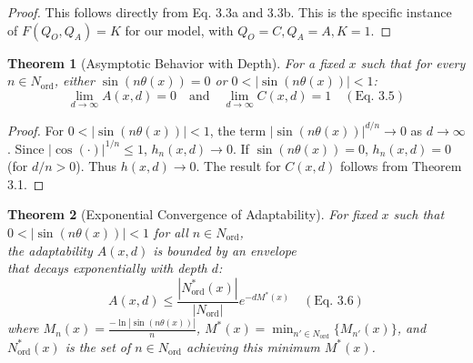 \documentclass[11pt,a4paper]{article}
\newtheorem{theorem}{Theorem}[section]
\begin{document}
\begin{proof}
This follows directly from Eq. 3.3a and 3.3b. This is the specific instance of $F(Q_O, Q_A)=K$ for our model, with $Q_O=C, Q_A=A, K=1$.
\end{proof}

\begin{theorem}[Asymptotic Behavior with Depth]
For a fixed $x$ such that for every $n \in N_{\text{ord}}$, either $\sin(n\theta(x))=0$ or $0 < |\sin(n\theta(x))|<1$:
\begin{equation}
    \lim_{d \to \infty} A(x,d) = 0 \quad \text{and} \quad \lim_{d \to \infty} C(x,d) = 1 \quad (\text{Eq. 3.5})
\end{equation}
\end{theorem}

\begin{proof}
For $0 < |\sin(n\theta(x))|<1$, the term $|\sin(n\theta(x))|^{d/n} \to 0$ as $d \to \infty$. Since $|\cos(\cdot)|^{1/n} \le 1$, $h_n(x,d) \to 0$. If $\sin(n\theta(x))=0$, $h_n(x,d)=0$ (for $d/n >0$). Thus $h(x,d) \to 0$. The result for $C(x,d)$ follows from Theorem 3.1.
\end{proof}

\begin{theorem}[Exponential Convergence of Adaptability]
For fixed $x$ such that $0 < |\sin(n\theta(x))|<1$ for all $n \in N_{\text{ord}}$, \\
the adaptability $A(x,d)$ is bounded by an envelope \\
that decays exponentially with depth $d$:
\begin{equation}
    A(x,d) \leq \frac{|N_{\text{ord}}^*(x)|}{|N_{\text{ord}}|} e^{-d M^*(x)} \quad (\text{Eq. 3.6})
\end{equation}
where $M_n(x) = \frac{-\ln|\sin(n\theta(x))|}{n}$, $M^*(x) = \min_{n' \in N_{\text{ord}}} \{M_{n'}(x)\}$, and $N_{\text{ord}}^*(x)$ is the set of $n \in N_{\text{ord}}$ achieving this minimum $M^*(x)$.
\end{theorem}
\end{document}
